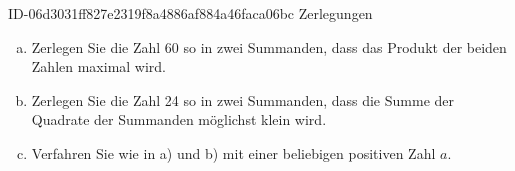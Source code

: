 \begin{exercise}
      {ID-06d3031ff827e2319f8a4886af884a46faca06bc}
      {Zerlegungen}
  \ifproblem\problem\par
    \begin{enumerate}[a)]
      \item Zerlegen Sie die Zahl 60 so in zwei Summanden,
            dass das Produkt der beiden Zahlen maximal wird.
      \item Zerlegen Sie die Zahl 24 so in zwei Summanden,
            dass die Summe der Quadrate der Summanden möglichst
            klein wird.
      \item Verfahren Sie wie in a) und b) mit einer beliebigen
            positiven Zahl $a$.
    \end{enumerate}
  \fi
\end{exercise}
